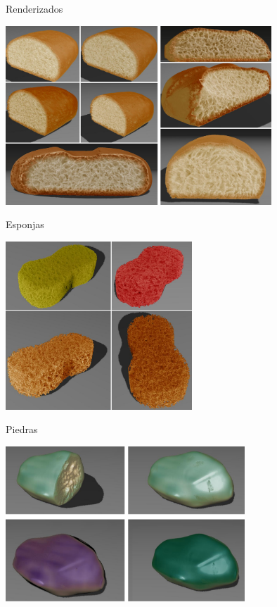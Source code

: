 \documentclass[spanish]{beamer}
\begin{document}
\begin{frame}{Renderizados}

\centerline{\includegraphics[width=10cm]{../figures/Fig12CAVW}}
\end{frame}

\begin{frame}{Esponjas}

\centerline{\includegraphics[width=7cm]{../figures/Fig13CAVW}}
\end{frame}

\begin{frame}{Piedras}

\centerline{\includegraphics[width=9cm]{../figures/Fig14CAVW}}
\end{frame}
\end{document}

